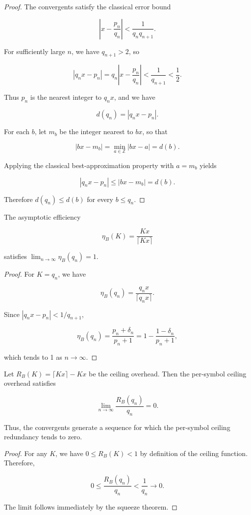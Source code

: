 \documentclass[10pt, conference]{IEEEtran}
\begin{document}
\begin{proof}
The convergents satisfy the classical error bound

\[
\left|x - \frac{p_n}{q_n}\right| < \frac{1}{q_n q_{n+1}}.
\]

For sufficiently large $n$, we have $q_{n+1} > 2$, so

\[
|q_n x - p_n| = q_n \left|x - \frac{p_n}{q_n}\right| < \frac{1}{q_{n+1}} < \frac{1}{2}.
\]

Thus $p_n$ is the nearest integer to $q_n x$, and we have

\[
d(q_n) = |q_n x - p_n|.
\]

For each $b$, let $m_b$ be the integer nearest to $b x$, so that

\[
|b x - m_b| = \min_{a \in \mathbb{Z}} |b x - a| = d(b).
\]

Applying the classical best-approximation property with $a = m_b$ yields

\[
|q_n x - p_n| \le |b x - m_b| = d(b).
\]

Therefore $d(q_n) \le d(b)$ for every $b \le q_n$.
\end{proof}

\begin{corollary}
The asymptotic efficiency

\[
\eta_B(K) = \frac{Kx}{\lceil Kx\rceil}
\]

satisfies $\lim_{n\to\infty} \eta_B(q_n) = 1$.
\end{corollary}

\begin{proof}
For $K = q_n$, we have

\[
\eta_B(q_n) = \frac{q_n x}{\lceil q_n x\rceil}.
\]

Since $|q_n x - p_n| < 1/q_{n+1}$,

\[
\eta_B(q_n) = \frac{p_n + \delta_n}{p_n + 1} = 1 - \frac{1 - \delta_n}{p_n + 1},
\]

which tends to 1 as $n \to \infty$.
\end{proof}

\begin{corollary}
Let $R_B(K) = \lceil Kx\rceil - Kx$ be the ceiling overhead. Then the per-symbol ceiling overhead satisfies

\[
\lim_{n\to\infty} \frac{R_B(q_n)}{q_n} = 0.
\]

Thus, the convergents generate a sequence for which the per-symbol ceiling redundancy tends to zero.
\end{corollary}

\begin{proof}
For any $K$, we have $0 \le R_B(K) < 1$ by definition of the ceiling function. Therefore,

\[
0 \le \frac{R_B(q_n)}{q_n} < \frac{1}{q_n} \to 0.
\]

The limit follows immediately by the squeeze theorem.
\end{proof}
\end{document}
